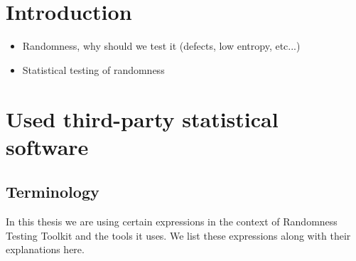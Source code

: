 \documentclass[
  digital,  	%
  color,		%
  oneside,   	%
  12pt,
  nocover,
  notable,
  nolof,
  nolot,
]{fithesis3}
\begin{document}
\chapter{Introduction}
\begin{itemize}
\item Randomness, why should we test it (defects, low entropy, etc...)
\item Statistical testing of randomness
\end{itemize}

\chapter{Used third-party statistical software}

\section{Terminology}
In this thesis we are using certain expressions in the context of Randomness Testing Toolkit and the tools it uses. We list these expressions along with their explanations here.
\end{document}
